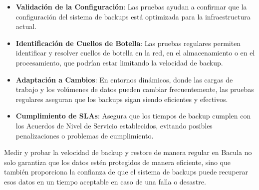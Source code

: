 \begin{itemize}
    \item \textbf{Validación de la Configuración}: Las pruebas ayudan a confirmar que la configuración del sistema de backups está optimizada para la infraestructura actual.
    \item \textbf{Identificación de Cuellos de Botella}: Las pruebas regulares permiten identificar y resolver cuellos de botella en la red, en el almacenamiento o en el procesamiento, que podrían estar limitando la velocidad de backup.
    \item \textbf{Adaptación a Cambios}: En entornos dinámicos, donde las cargas de trabajo y los volúmenes de datos pueden cambiar frecuentemente, las pruebas regulares aseguran que los backups sigan siendo eficientes y efectivos.
    \item \textbf{Cumplimiento de SLAs}: Asegura que los tiempos de backup cumplen con los Acuerdos de Nivel de Servicio establecidos, evitando posibles penalizaciones o problemas de cumplimiento.
\end{itemize}

Medir y probar la velocidad de backup y restore de manera regular en Bacula no solo garantiza que los datos estén protegidos de manera eficiente, sino que también proporciona la confianza de que el sistema de backups puede recuperar esos datos en un tiempo aceptable en caso de una falla o desastre.

